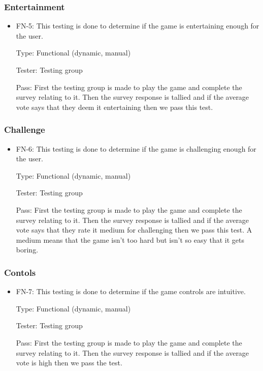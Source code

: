 \documentclass[12pt,letterpaper]{article}
\begin{document}
	\subsubsection{Entertainment}
\begin{reqbox}
	\begin{itemize}
	\item FN-5: This testing is done to determine if the game is entertaining enough for the user. 

	Type: Functional (dynamic, manual)

	Tester: Testing group

	Pass: First the testing group is made to play the game and complete the survey relating to it. Then the survey response is tallied and if the average vote says that they deem it entertaining then we pass this test.

	\end{itemize}
\end{reqbox}

	\subsubsection{Challenge}
\begin{reqbox}
	\begin{itemize}

	\item FN-6: This testing is done to determine if the game is challenging enough for the user. 

	Type: Functional (dynamic, manual)

	Tester: Testing group

	Pass: First the testing group is made to play the game and complete the survey relating to it. Then the survey response is tallied and if the average vote says that they rate it medium for challenging then we pass this test. A medium means that the game isn’t too hard but isn’t so easy that it gets boring.

	\end{itemize}
\end{reqbox}

	\subsubsection{Contols}
\begin{reqbox}
	\begin{itemize}
	\item FN-7: This testing is done to determine if the game controls are intuitive.

	Type: Functional (dynamic, manual)
	
	Tester: Testing group

	Pass: First the testing group is made to play the game and complete the survey relating to it. Then the survey response is tallied and if the average vote is high then we pass the test.
	\end{itemize}
\end{reqbox}
\end{document}
